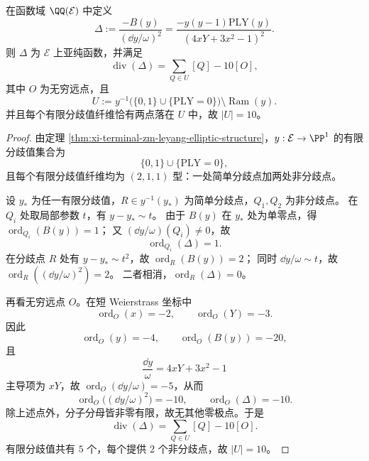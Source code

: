 \begin{theorem}[判别式核函数的除子结构与分歧纤维剥离]\label{thm:xi-terminal-zm-discriminant-kernel-divisor-branch-fiber-peeling}
在函数域 \(\QQ(\mathcal E)\) 中定义
\[
\Delta:=\frac{-B(y)}{(\dd y/\omega)^2}
=\frac{-y(y-1)\mathrm{PLY}(y)}{(4xY+3x^2-1)^2}.
\]
则 \(\Delta\) 为 \(\mathcal E\) 上亚纯函数，并满足
\[
\operatorname{div}(\Delta)=\sum_{Q\in U}[Q]-10[O],
\]
其中 \(O\) 为无穷远点，且
\[
U:=y^{-1}\!\bigl(\{0,1\}\cup\{\mathrm{PLY}=0\}\bigr)\setminus \operatorname{Ram}(y).
\]
并且每个有限分歧值纤维恰有两点落在 \(U\) 中，故 \(|U|=10\)。
\end{theorem}
\begin{proof}
由定理 \ref{thm:xi-terminal-zm-leyang-elliptic-structure}，\(y:\mathcal E\to\PP^1\) 的有限分歧值集合为
\[
\{0,1\}\cup\{\mathrm{PLY}=0\},
\]
且每个有限分歧值纤维均为 \((2,1,1)\) 型：一处简单分歧点加两处非分歧点。

设 \(y_*\) 为任一有限分歧值，\(R\in y^{-1}(y_*)\) 为简单分歧点，\(Q_1,Q_2\) 为非分歧点。
在 \(Q_i\) 处取局部参数 \(t\)，有 \(y-y_*\sim t\)。
由于 \(B(y)\) 在 \(y_*\) 处为单零点，得 \(\operatorname{ord}_{Q_i}(B(y))=1\)；
又 \((\dd y/\omega)(Q_i)\neq 0\)，故
\[
\operatorname{ord}_{Q_i}(\Delta)=1.
\]
在分歧点 \(R\) 处有 \(y-y_*\sim t^2\)，故 \(\operatorname{ord}_{R}(B(y))=2\)；
同时 \(\dd y/\omega\sim t\)，故 \(\operatorname{ord}_{R}((\dd y/\omega)^2)=2\)。
二者相消，\(\operatorname{ord}_{R}(\Delta)=0\)。

再看无穷远点 \(O\)。在短 Weierstrass 坐标中
\[
\operatorname{ord}_{O}(x)=-2,\qquad \operatorname{ord}_{O}(Y)=-3.
\]
因此
\[
\operatorname{ord}_{O}(y)=-4,\qquad
\operatorname{ord}_{O}(B(y))=-20,
\]
且
\[
\frac{\dd y}{\omega}=4xY+3x^2-1
\]
主导项为 \(xY\)，故 \(\operatorname{ord}_{O}(\dd y/\omega)=-5\)，从而
\[
\operatorname{ord}_{O}\!\bigl((\dd y/\omega)^2\bigr)=-10,\qquad
\operatorname{ord}_{O}(\Delta)=-10.
\]
除上述点外，分子分母皆非零有限，故无其他零极点。于是
\[
\operatorname{div}(\Delta)=\sum_{Q\in U}[Q]-10[O].
\]
有限分歧值共有 \(5\) 个，每个提供 \(2\) 个非分歧点，故 \(|U|=10\)。
\end{proof}


